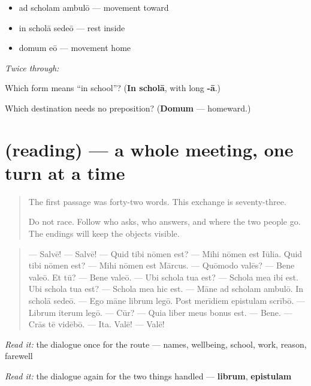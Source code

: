 \begin{itemize}
\raggedright
  \item ad scholam ambulō — movement toward
  \item in scholā sedeō — rest inside
  \item domum eō — movement home
\end{itemize}

\emph{Twice through:}

\begin{tcolorbox}[breakable,colback=teal!4,colframe=teal!35!black,title={Before you move on}]
Which form means \textquotedblleft{}in school\textquotedblright{}? (\textbf{In scholā}, with long \textbf{-ā}.)

Which destination needs no preposition? (\textbf{Domum} — homeward.)
\end{tcolorbox}
\section[(reading)]{(reading) — a whole meeting, one turn at a time}

\label{lesson:LA-C59-social-exchange}



\begin{quote}
The first passage was forty-two words. This exchange is seventy-three.

Do not race. Follow who asks, who answers, and where the two people go. The endings will keep the objects visible.
\end{quote}

\begin{tcolorbox}[breakable,skin=enhanced,colback=orange!6,colframe=orange!45!black,boxrule=0.5pt,arc=1mm,left=6pt,right=6pt,top=4pt,bottom=4pt,fonttitle=\bfseries,title={Read this}]
\begin{quote}
— Salvē! — Salvē! — Quid tibi nōmen est? — Mihi nōmen est Iūlia. Quid tibi nōmen est? — Mihi nōmen est Mārcus. — Quōmodo valēs? — Bene valeō. Et tū? — Bene valeō. — Ubi schola tua est? — Schola mea ibi est. Ubi schola tua est? — Schola mea hic est. — Māne ad scholam ambulō. In scholā sedeō. — Ego māne librum legō. Post merīdiem epistulam scrībō. — Librum iterum legō. — Cūr? — Quia liber meus bonus est. — Bene. — Crās tē vidēbō. — Ita. Valē! — Valē!
\end{quote}

\emph{Read it:} the dialogue once for the route — names, wellbeing, school, work, reason, farewell

\emph{Read it:} the dialogue again for the two things handled — \textbf{librum}, \textbf{epistulam}
\end{tcolorbox}

